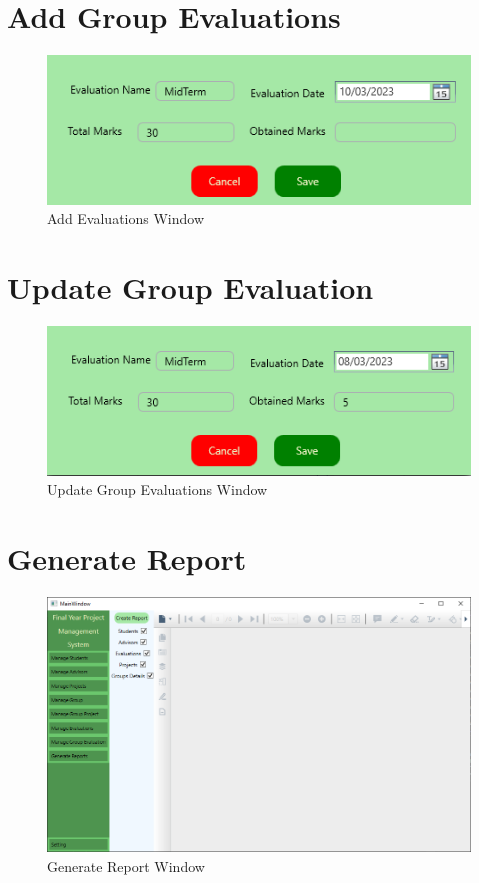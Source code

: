 \documentclass[a4paper, 12pt, oneside]{uet_thesis}
\begin{document}
\section{Add Group Evaluations}
\begin{figure}[h]
    \centering
    \includegraphics[width=1\textwidth]{Figures/AddEvaluateGroup.png}
    \caption{Add Evaluations Window}
    \label{fig:my_label}
\end{figure}

\section{Update Group Evaluation}
\begin{figure}[h]
    \centering
    \includegraphics[width=1\textwidth]{Figures/UpdateGroupEvaluation.png}
    \caption{Update Group Evaluations Window}
    \label{fig:my_label}
\end{figure}
\clearpage

\section{Generate Report}
\begin{figure}[h]
    \centering
    \includegraphics[width=1\textwidth]{Figures/Generate Report.png}
    \caption{Generate Report Window}
    \label{fig:my_label}
\end{figure}
\clearpage
\end{document}

